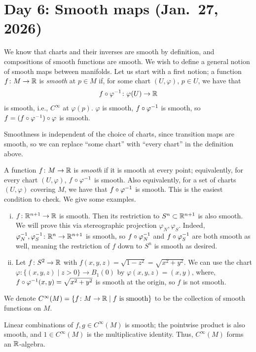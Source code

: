 \section{Day 6: Smooth maps (Jan.\ 27, 2026)}
We know that charts and their inverses are smooth by definition, and compositions of smooth functions are smooth. We wish to define a general notion of smooth maps between manifolds. Let us start with a first notion; a function $f \colon M \to \mathbb R$ is \textit{smooth} at $p \in M$ if, for some chart $(U, \varphi)$, $p \in U$, we have that
\[ f \circ \varphi^{-1} \colon \varphi(U) \to \mathbb R \]
is smooth, i.e., $C^\infty$ at $\varphi(p)$. $\varphi$ is smooth, $f \circ \varphi^{-1}$ is smooth, so $f = (f \circ \varphi^{-1}) \circ \varphi$ is smooth.
\begin{remark}
    Smoothness is independent of the choice of charts, since transition maps are smooth, so we can replace ``some chart'' with ``every chart'' in the definition above.
\end{remark}
A function $f \colon M \to \mathbb R$ is \textit{smooth} if it is smooth at every point; equivalently, for every chart $(U, \varphi)$, $f \circ \varphi^{-1}$ is smooth. Also equivalently, for a set of charts $(U, \varphi)$ covering $M$, we have that $f \circ \varphi^{-1}$ is smooth. This is the easiest condition to check. We give some examples.
\begin{enumerate}[(i)]
    \item $f \colon \mathbb R^{n+1} \to \mathbb R$ is smooth. Then its restriction to $S^n \subset \mathbb R^{n+1}$ is also smooth. We will prove this via stereographic projection $\varphi_N, \varphi_S$. Indeed, $\varphi_N^{-1}, \varphi_S^{-1} \colon \mathbb R^n \to \mathbb R^{n+1}$ is smooth, so $f \circ \varphi_N^{-1}$ and $f \circ \varphi_S^{-1}$ are both smooth as well, meaning the restriction of $f$ down to $S^n$ is smooth as desired.
    \item Let $f \colon S^2 \to \mathbb R$ with $f(x, y, z) = \sqrt{1 - z^2} = \sqrt{x^2 + y^2}$. We can use the chart $\varphi \colon \{(x, y, z) \mid z > 0\} \to B_1(0)$ by $\varphi(x, y, z) = (x, y)$, where, $f \circ \varphi^{-1}(x, y) = \sqrt{x^2 + y^2}$ is smooth at the origin, so $f$ is not smooth.
\end{enumerate}
We denote $C^\infty(M) = \{f \colon M \to \mathbb R \mid f \text{ is smooth}\}$ to be the collection of smooth functions on $M$.
\begin{fact}
    Linear combinations of $f, g \in C^\infty(M)$ is smooth; the pointwise product is also smooth, and $1 \in C^\infty(M)$ is the multiplicative identity. Thus, $C^\infty(M)$ forms an $\mathbb R$-algebra.
\end{fact}
